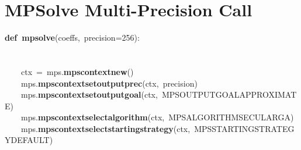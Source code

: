 \documentclass{article}\usepackage[]{graphicx}\usepackage[dvipsnames,table]{xcolor}
\makeatletter
\newcommand{\hlnum}[1]{\textcolor[rgb]{0.686,0.059,0.569}{#1}}%
\newcommand{\hlopt}[1]{\textcolor[rgb]{0,0,0}{#1}}%
\newcommand{\hldef}[1]{\textcolor[rgb]{0.345,0.345,0.345}{#1}}%
\newcommand{\hlkwa}[1]{\textcolor[rgb]{0.161,0.373,0.58}{\textbf{#1}}}%
\newcommand{\hlkwd}[1]{\textcolor[rgb]{0.737,0.353,0.396}{\textbf{#1}}}%
\newenvironment{kframe}{%
 \def\at@end@of@kframe{}%
 \ifinner\ifhmode%
  \def\at@end@of@kframe{\end{minipage}}%
  \begin{minipage}{\columnwidth}%
 \fi\fi%
 \def\FrameCommand##1{\hskip\@totalleftmargin \hskip-\fboxsep
 \colorbox{shadecolor}{##1}\hskip-\fboxsep
     \hskip-\linewidth \hskip-\@totalleftmargin \hskip\columnwidth}%
 \MakeFramed {\advance\hsize-\width
   \@totalleftmargin\z@ \linewidth\hsize
   \@setminipage}}%
 {\par\unskip\endMakeFramed%
 \at@end@of@kframe}
\newenvironment{knitrout}{}{} %
\makeatother
\begin{document}
\newpage
\section{MPSolve Multi-Precision Call}
\begin{center}
\begin{minipage}[m]{18cm}
\begin{knitrout}\small
{}\color{fgcolor}\begin{kframe}
\noindent
\ttfamily
\hldef{}\hlkwa{def\ }\hldef{}\hlkwd{mpsolve}\hldef{}\hlopt{(}\hldef{coeffs}\hlopt{,\ }\hldef{precision}\hlopt{=}\hldef{}\hlnum{256}\hldef{}\hlopt{):}\hspace*{\fill}\\
\hldef{}\hspace*{\fill}\\
\hldef{}\hldef{\ \ \ \ }\hldef{}\hspace*{\fill}\\
\hldef{}\hldef{\ \ \ \ }\hldef{ctx\ }\hlopt{=\ }\hldef{\textunderscore mps}\hlopt{.}\hldef{}\hlkwd{mps\textunderscore context\textunderscore new}\hldef{}\hlopt{()}\hspace*{\fill}\\
\hldef{}\hldef{\ \ \ \ }\hldef{\textunderscore mps}\hlopt{.}\hldef{}\hlkwd{mps\textunderscore context\textunderscore set\textunderscore output\textunderscore prec}\hldef{}\hlopt{(}\hldef{ctx}\hlopt{,\ }\hldef{precision}\hlopt{)}\hspace*{\fill}\\
\hldef{}\hldef{\ \ \ \ }\hldef{\textunderscore mps}\hlopt{.}\hldef{}\hlkwd{mps\textunderscore context\textunderscore set\textunderscore output\textunderscore goal}\hldef{}\hlopt{(}\hldef{ctx}\hlopt{,\ }\hldef{MPS\textunderscore OUTPUT\textunderscore GOAL\textunderscore APPROXIMATE}\hlopt{)}\hspace*{\fill}\\
\hldef{}\hldef{\ \ \ \ }\hldef{\textunderscore mps}\hlopt{.}\hldef{}\hlkwd{mps\textunderscore context\textunderscore select\textunderscore algorithm}\hldef{}\hlopt{(}\hldef{ctx}\hlopt{,\ }\hldef{MPS\textunderscore ALGORITHM\textunderscore SECULAR\textunderscore GA}\hlopt{)}\hspace*{\fill}\\
\hldef{}\hldef{\ \ \ \ }\hldef{\textunderscore mps}\hlopt{.}\hldef{}\hlkwd{mps\textunderscore context\textunderscore select\textunderscore starting\textunderscore strategy}\hldef{}\hlopt{(}\hldef{ctx}\hlopt{,\ }\hldef{MPS\textunderscore STARTING\textunderscore STRATEGY\textunderscore DEFAULT}\hlopt{)}\hspace*{\fill}\\

\end{kframe}
\end{knitrout}
\end{minipage}
\end{center}
\end{document}
